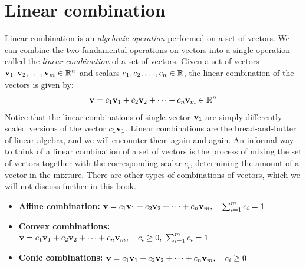 \section{Linear combination}
Linear combination is an \textit{algebraic operation} performed on a set of vectors. We can combine the two fundamental operations on vectors into a single operation called the \textit{linear combination} of a set of vectors. Given a set of vectors $\mathbf{v}_1, \mathbf{v}_2, \ldots, \mathbf{v}_m \in \mathbb{R}^n$ and scalars $c_1, c_2, \ldots, c_n \in \mathbb{R}$, the linear combination of the vectors is given by:
\begin{equation}
    \mathbf{v} = c_1 \mathbf{v}_1 + c_2 \mathbf{v}_2 + \cdots + c_n \mathbf{v}_m \in \mathbb{R}^n
    \label{eq:linear-comb}
\end{equation}
Notice that the linear combinations of single vector $\mathbf{v}_1$ are simply differently scaled versions of the vector $c_1 \mathbf{v}_1$. Linear combinations are the bread-and-butter of linear algebra, and we will encounter them again and again. An informal way to think of a linear combination of a set of vectors is the process of mixing the set of vectors together with the corresponding scalar $c_i$, determining the amount of a vector in the mixture. There are other types of combinations of vectors, which we will not discuss further in this book.
\begin{itemize}
    \item \textbf{Affine combination:} $\mathbf{v} = c_1 \mathbf{v}_1 + c_2 \mathbf{v}_2 + \cdots + c_n \mathbf{v}_m, \quad \sum_{i=1}^{m} c_i = 1$
    \item \textbf{Convex combinations:} $\mathbf{v} = c_1 \mathbf{v}_1 + c_2 \mathbf{v}_2 + \cdots + c_n \mathbf{v}_m, \quad c_i \geq 0, \,\, \sum_{i=1}^{m} c_i = 1$
    \item \textbf{Conic combinations:} $\mathbf{v} = c_1 \mathbf{v}_1 + c_2 \mathbf{v}_2 + \cdots + c_n \mathbf{v}_m, \quad c_i \geq 0$
\end{itemize}

